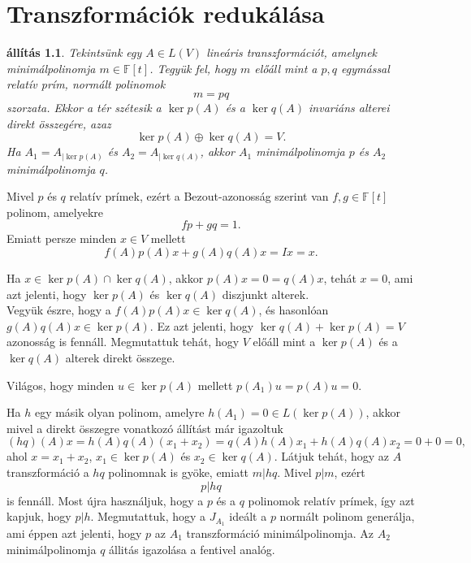 \documentclass[9pt, a4paper, showtrims]{memoir}
\makeatletter
\renewenvironment{proof}[1][\proofname]
    {\par\pushQED{\qed}%
    \normalfont \topsep6\p@\@plus6\p@\relax
    \trivlist
    \item[\hskip\labelsep
        \itshape
    #1\@addpunct{:}]\ignorespaces}
    {\popQED\endtrivlist\@endpefalse}
\theoremstyle{plain}
\newtheorem{proposition}{állítás}[chapter]
\theoremstyle{remark}
\theoremstyle{definition}
\makeatother
\begin{document}
\chapter{Transzformációk redukálása}
\begin{proposition}
	Tekintsünk egy $A\in L\left( V \right)$ lineáris transzformációt,
	amelynek minimálpolinomja $m\in\mathbb{F}\left[ t \right]$.
	Tegyük fel, hogy $m$ előáll mint a $p,q$ egymással relatív prím, normált
	polinomok
	\[
		m=pq
	\]
	szorzata.
	Ekkor a tér szétesik a
	$\ker p\left( A \right)$ és a
	$\ker q\left( A \right)$ invariáns alterei direkt összegére, azaz
	\[
		\ker p\left( A \right)\oplus
		\ker q\left( A \right)=
		V.
	\]
	Ha $A_1=A_{|\ker p\left( A \right)}$ és
	$A_2=A_{|\ker q\left( A \right)}$, akkor $A_1$ minimálpolinomja $p$ és $A_2$ minimálpolinomja $q$.
\end{proposition}
\begin{proof}
	Mivel $p$ és $q$ relatív prímek, ezért a Bezout-azonosság szerint van $f,g\in\mathbb{F}\left[ t \right]$ polinom, amelyekre
	\[
		fp+gq=1.
	\]
	Emiatt persze minden $x\in V$ mellett
	\[
		f\left( A \right)p\left( A \right)x
		+
		g\left( A \right)q\left( A \right)x=Ix=x.\tag{\dag}
	\]

	Ha $x\in\ker p\left( A \right)\cap\ker q\left( A \right)$,
	akkor
	$p\left( A \right)x=0=q\left( A \right)x$, tehát $x=0$, ami azt jelenti, hogy
	$\ker p\left( A \right)$ és
	$\ker q\left( A \right)$ diszjunkt alterek.
	\\
	Vegyük észre, hogy a
	$f\left( A \right)p\left( A \right)x\in\ker q\left( A \right)$,
	és hasonlóan
	$g\left( A \right)q\left( A \right)x\in\ker p\left( A \right)$.
	Ez azt jelenti, hogy $\ker q\left( A \right)+\ker p\left( A \right)=V$ azonosság is fennáll.
	Megmutattuk tehát, hogy $V$ előáll mint a $\ker p\left( A \right)$ és a
	$\ker q\left( A \right)$ alterek direkt összege.

	Világos, hogy minden $u\in\ker p\left( A \right)$ mellett
	$p\left( A_1 \right)u
		=
		p\left( A \right)u=0$.

	Ha $h$ egy másik olyan polinom, amelyre $h\left( A_1 \right)=0\in L\left( \ker p\left( A \right) \right)$,
	akkor mivel a direkt összegre vonatkozó állítást már igazoltuk
	\[
		(hq)\left( A \right)x=
		h\left( A \right)q\left( A \right)\left( x_1+x_2 \right)
		=
		q\left( A \right)h\left( A \right)x_1
		+
		h\left( A \right)q\left( A \right)x_2
		=0+0
		=0,
	\]
	ahol $x=x_1+x_2$, $x_1\in \ker p\left( A \right)$ és
	$x_2\in\ker q\left( A \right)$.
	Látjuk tehát, hogy az $A$ transzformáció a $hq$ polinomnak is gyöke,
	emiatt $m|hq$.
	Mivel $p|m$, ezért
	\[p|hq\] is fennáll.
	Most újra használjuk, hogy a $p$ és a $q$ polinomok relatív prímek,
	így azt kapjuk, hogy $p|h.$
	Megmutattuk, hogy a $J_{A_1}$ ideált a $p$ normált polinom generálja,
	ami éppen azt jelenti, hogy $p$ az $A_1$ transzformáció minimálpolinomja.
	Az $A_2$ minimálpolinomja $q$ állitás igazolása a fentivel analóg.
\end{proof}
\end{document}
